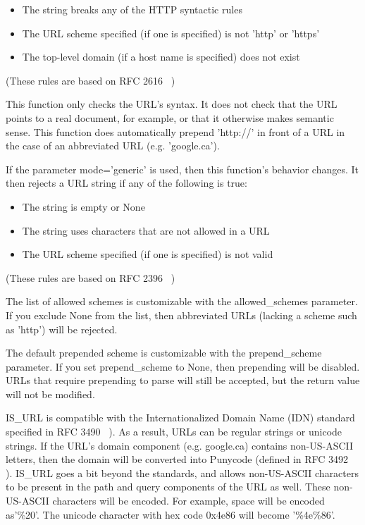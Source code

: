 \documentclass[justified,sixbynine,notoc]{tufte-book}
\begin{document}
\begin{fullwidth}
\begin{itemize}
\item The string breaks any of the HTTP syntactic rules

\item The URL scheme specified (if one is specified) is not 'http' or 'https'

\item The top-level domain (if a host name is specified) does not exist
\end{itemize}

(These rules are based on RFC 2616~\cite{RFC2616} )

This function only checks the URL's syntax. It does not check that the URL points to a real document,
for example, or that it otherwise makes semantic sense. This function does automatically prepend
'http://' in front of a URL in the case of an abbreviated URL (e.g. 'google.ca').

If the parameter mode='generic' is used, then this function's behavior changes. It then rejects a URL string if any of the following is true:
\begin{itemize}
\item The string is empty or None

\item The string uses characters that are not allowed in a URL

\item The URL scheme specified (if one is specified) is not valid
\end{itemize}

(These rules are based on RFC 2396~\cite{RFC2396} )

The list of allowed schemes is customizable with the allowed\_schemes parameter. If you exclude None from
the list, then abbreviated URLs (lacking a scheme such as 'http') will be rejected.

The default prepended scheme is customizable with the prepend\_scheme parameter. If you set prepend\_scheme
to None, then prepending will be disabled. URLs that require prepending to parse will still be accepted,
but the return value will not be modified.

IS\_URL is compatible with the Internationalized Domain Name (IDN) standard specified in RFC 3490~\cite{RFC3490} ). As a result, URLs can be regular strings or unicode strings.
If the URL's domain component (e.g. google.ca) contains non-US-ASCII letters, then the domain will
be converted into Punycode (defined in RFC 3492~\cite{RFC3492} ). IS\_URL goes a
bit beyond the standards, and allows non-US-ASCII characters to be present in the path
and query components of the URL as well. These non-US-ASCII characters will be encoded.
For example, space will be encoded as'\%20'. The unicode character with hex code 0x4e86
will become '\%4e\%86'.


\end{fullwidth}
\end{document}
